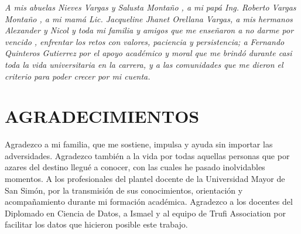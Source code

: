 
\thispagestyle{empty}
\vspace*{6cm}
\begin{flushright}
  \interlineadoResumen
  \textit{A mis abuelas Nieves Vargas y Salusta Montaño \dag, a mi papá Ing. Roberto Vargas Montaño , 
  a mi mamá Lic. Jacqueline Jhanet Orellana Vargas, a mis hermanos Alexander y Nicol y toda mi familia 
  y amigos que me enseñaron a no darme por vencido , enfrentar los retos con valores, paciencia y persistencia;
   a Fernando Quinteros Gutierrez por el apoyo académico y moral que me brindó durante casi toda la vida universitaria en la carrera,
   y a las comunidades que me dieron el criterio para poder crecer por mi cuenta.}
\end{flushright}
\clearpage

\chapter*{AGRADECIMIENTOS}
\thispagestyle{empty}   %
\begingroup           %
\interlineadoResumen
Agradezco a mi familia, que me sostiene, impulsa y ayuda sin importar las adversidades.
Agradezco también a la vida por todas aquellas personas que por azares del destino llegué
a conocer, con las cuales he pasado inolvidables momentos. 
A los profesionales del plantel docente de la Universidad Mayor de San Simón, por la transmisión de sus
 conocimientos, orientación y acompañamiento durante mi formación académica.
Agradezco a los docentes del
Diplomado en Ciencia de Datos, a Ismael y al equipo de Trufi Association por facilitar los datos que
hicieron posible este trabajo.
\endgroup
\clearpage

